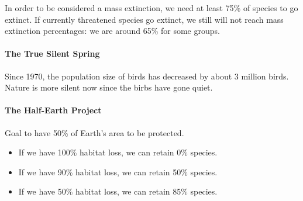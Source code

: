 \documentclass[12pt]{article}
\begin{document}
In order to be considered a mass extinction, we need at least 75\% of species to go extinct. If currently threatened species go extinct, we still will not reach mass extinction percentages: we are around 65\% for some groups.

\paragraph{The True Silent Spring}
Since 1970, the population size of birds has decreased by about 3 million birds. Nature is more silent now since the birbs have gone quiet.

\paragraph{The Half-Earth Project}
Goal to have 50\% of Earth's area to be protected.

\begin{itemize}
    \item If we have 100\% habitat loss, we can retain 0\% species.
    \item If we have 90\% habitat loss, we can retain 50\% species.
    \item If we have 50\% habitat loss, we can retain 85\% species.
\end{itemize}
\end{document}
